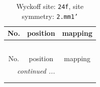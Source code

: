 \documentclass[fleqn,8pt]{jsarticle}
\begin{document}
\renewcommand{\arraystretch}{1.2}
\begin{longtable}{ccc}
\caption{Wyckoff site: {\tt 24f}, site symmetry: {\tt 2.mm1'}}
 \\
 \hline \hline
No. & position & mapping \\ \hline \endfirsthead

\multicolumn{2}{l}{\tablename\ \thetable{}} \\
 \hline \hline
No. & position & mapping \\ \hline \endhead

 \hline \hline
\multicolumn{2}{r}{\footnotesize\it continued ...} \\ \endfoot

 \hline \hline
\multicolumn{2}{r}{} \\ \endlastfoot


\end{longtable}
\end{document}
